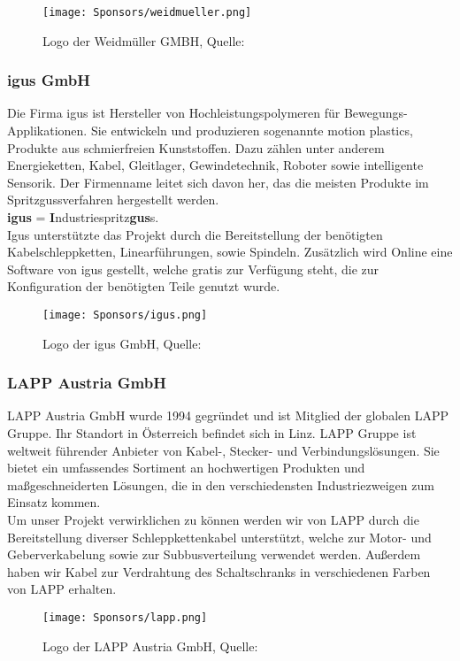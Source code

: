 \begin{figure}[H]
    \centering
    \texttt{[image: Sponsors/weidmueller.png]}
    \caption{Logo der Weidmüller GMBH, Quelle: \cite{weidmueller_logo}}
    \label{fig:weidmueller_logo}
\end{figure}

\subsubsection{igus GmbH}
Die Firma igus ist Hersteller von Hochleistungspolymeren für Bewegungs-Applikationen. Sie entwickeln und produzieren sogenannte motion plastics, Produkte aus schmierfreien Kunststoffen. Dazu zählen unter anderem Energieketten, Kabel, Gleitlager, Gewindetechnik, Roboter sowie intelligente Sensorik. Der Firmenname leitet sich davon her, das die meisten Produkte im Spritzgussverfahren hergestellt werden.\\
\textbf{igus} = \textbf{I}ndustriespritz\textbf{gus}s. \cite{igus} \\
Igus unterstützte das Projekt durch die Bereitstellung der benötigten Kabelschleppketten, Linearführungen, sowie Spindeln. Zusätzlich wird Online eine Software von igus gestellt, welche gratis zur Verfügung steht, die zur Konfiguration der benötigten Teile genutzt wurde.

\begin{figure}[H]
    \centering
    \texttt{[image: Sponsors/igus.png]}
    \caption{Logo der igus GmbH,  Quelle: \cite{igus_logo}}
    \label{fig:igus_logo}
\end{figure}

\subsubsection{LAPP Austria GmbH}
LAPP Austria GmbH wurde 1994 gegründet und ist Mitglied der globalen LAPP Gruppe. Ihr Standort in Österreich befindet sich in Linz. LAPP Gruppe ist weltweit führender Anbieter von Kabel-, Stecker- und Verbindungslösungen. Sie bietet ein umfassendes Sortiment an hochwertigen Produkten und maßgeschneiderten Lösungen, die in den verschiedensten Industriezweigen zum Einsatz kommen.\cite{lapp}\\
Um unser Projekt verwirklichen zu können werden wir von LAPP durch die Bereitstellung diverser Schleppkettenkabel unterstützt, welche zur Motor- und Geberverkabelung sowie zur Subbusverteilung verwendet werden. Außerdem haben wir Kabel zur Verdrahtung des Schaltschranks in verschiedenen Farben von LAPP erhalten.
\begin{figure}[H]
    \centering
    \vspace{5mm}
    \texttt{[image: Sponsors/lapp.png]}
    \caption{Logo der LAPP Austria GmbH, Quelle: \cite{lapp_logo}}
    \label{fig:lapp_logo}
\end{figure}

